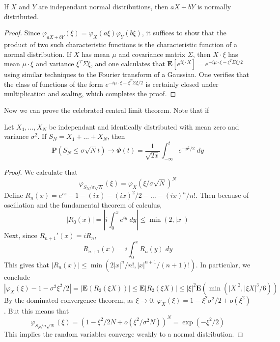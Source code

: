\begin{theorem}
    If $X$ and $Y$ are independant normal distributions, then $aX + bY$ is normally distributed.
\end{theorem}
\begin{proof}
    Since $\varphi_{aX+bY}(\xi) = \varphi_X(a \xi) \varphi_Y(b \xi)$, it suffices to show that the product of two such characteristic functions is the characteristic function of a normal distribution. If $X$ has mean $\mu$ and covariance matrix $\Sigma$, then $X \cdot \xi$ has mean $\mu \cdot \xi$ and variance $\xi^T \Sigma \xi$, and one calculates that $\mathbf{E}[e^{i \xi \cdot X}] = e^{- i \mu \cdot \xi - \xi^T \Sigma \xi / 2}$ using similar techniques to the Fourier transform of a Gaussian. One verifies that the class of functions of the form $e^{-i \mu \cdot \xi - \xi^T \Sigma \xi / 2}$ is certainly closed under multiplication and scaling, which completes the proof. 
\end{proof}

Now we can prove the celebrated central limit theorem. Note that if

\begin{theorem}
    Let $X_1, \dots, X_N$ be independant and identically distributed with mean zero and variance $\sigma^2$. If $S_N = X_1 + \dots + X_N$, then
    \[ \mathbf{P}(S_N \leq \sigma \sqrt{N} t) \to \Phi(t) = \frac{1}{\sqrt{2x}} \int_{-\infty}^t e^{-y^2/2}\; dy \]
\end{theorem}
\begin{proof}
    We calculate that
    \[ \varphi_{S_N/\sigma \sqrt{N}}(\xi) = \varphi_X(\xi/\sigma \sqrt{N})^N \]
    Define $R_n(x) = e^{ix} - 1 - (ix) - (ix)^2/2 - \dots - (ix)^n/n!$. Then because of oscillation and the fundamental theorem of calculus,
    \[ |R_0(x)| = \left| i \int_0^x e^{iy}\; dy \right| \leq \min(2,|x|) \]
    Next, since $R_{n+1}'(x) = i R_n$,
    \[ R_{n+1}(x) = i  \int_0^x R_n(y)\; dy \]
    This gives that $|R_n(x)| \leq \min(2|x|^n/n!,|x|^{n+1}/(n+1)!)$. In particular, we conclude
    \[ |\varphi_X(\xi) - 1 - \sigma^2 \xi^2/2| = |\mathbf{E}(R_2(\xi X))| \leq \mathbf{E}|R_2(\xi X)| \leq |\xi|^2 \mathbf{E} \left( \min \left( |X|^2, |\xi X|^3/6 \right) \right) \]
    By the dominated convergence theorem, as $\xi \to 0$, $\varphi_X(\xi) = 1 - \xi^2 \sigma^2/2 + o(\xi^2)$. But this means that
    \[ \varphi_{S_N/\sigma \sqrt{N}}(\xi) = (1 - \xi^2 / 2 N + o(\xi^2/\sigma^2 N))^N = \exp(-\xi^2/2) \]
    This implies the random variables converge weakly to a normal distribution.
\end{proof}


